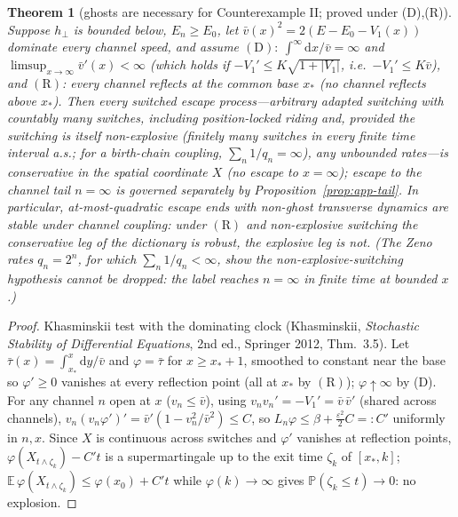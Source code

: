 \documentclass[11pt]{article}
\newtheorem{theorem}{Theorem}[section]
\theoremstyle{definition}
\theoremstyle{remark}
\newcommand{\dd}{\mathrm{d}}
\newcommand{\Prob}{\mathbb{P}}
\newcommand{\EE}{\mathbb{E}}
\begin{document}
\begin{theorem}[ghosts are necessary for Counterexample II; proved
under (D),(R)]\label{thm:app-ghost}
Suppose $h_{\perp}$ is bounded below, $E_{n}\ge E_{0}$, let
$\bar v(x)^{2}=2(E-E_{0}-V_{1}(x))$ dominate every channel speed, and
assume $(\mathrm D):\ \int^{\infty}\dd x/\bar v=\infty$ and
$\limsup_{x\to\infty}\bar v'(x)<\infty$ (which holds if
$-V_{1}'\le K\sqrt{1+|V_{1}|}$, i.e.\ $-V_{1}'\le K\bar v$),
and $(\mathrm R)$: every channel reflects at the common base $x_{*}$ (no
channel reflects above $x_{*}$). Then \emph{every} switched escape
process---arbitrary adapted switching with countably many switches,
including position-locked riding and, \emph{provided the switching is
itself non-explosive} (finitely many switches in every finite time interval
a.s.; for a birth-chain coupling, $\sum_{n}1/q_{n}=\infty$), any unbounded
rates---is conservative \emph{in the spatial coordinate} $X$ (no escape to
$x=\infty$); escape to the channel tail $n=\infty$ is governed separately by
Proposition~\ref{prop:app-tail}. In particular, at-most-quadratic escape ends with
non-ghost transverse dynamics are stable under
channel coupling: under $(\mathrm R)$ and non-explosive switching the
conservative leg of the dictionary
is robust, the explosive leg is not. (The Zeno rates $q_{n}=2^{n}$, for which
$\sum_{n}1/q_{n}<\infty$, show the non-explosive-switching hypothesis cannot be
dropped: the label reaches $n=\infty$ in finite time at bounded $x$.)
\end{theorem}

\begin{proof}
Khasminskii test with the dominating clock (Khasminskii,
\emph{Stochastic Stability of Differential Equations}, 2nd ed.,
Springer 2012, Thm.~3.5). Let $\bar\tau(x)=\int_{x_{*}}^{x}\dd y/\bar v$
and $\varphi=\bar\tau$ for $x\ge x_{*}+1$, smoothed to constant near the
base so $\varphi'\ge0$ vanishes at every reflection point (all at $x_{*}$ by
$(\mathrm R)$);
$\varphi\uparrow\infty$ by (D). For any channel $n$ open at $x$
($v_{n}\le\bar v$), using $v_{n}v_{n}'=-V_{1}'=\bar v\,\bar v'$ (shared
across channels),
$v_{n}(v_{n}\varphi')'=\bar v'(1-v_{n}^{2}/\bar v^{2})\le C$, so
$L_{n}\varphi\le\beta+\tfrac{\varepsilon^{2}}{2}C=:C'$ uniformly in
$n,x$. Since $X$ is continuous across switches and $\varphi'$ vanishes
at reflection points, $\varphi(X_{t\wedge\zeta_{k}})-C't$ is a
supermartingale up to the exit time $\zeta_{k}$ of $[x_{*},k]$;
$\EE\,\varphi(X_{t\wedge\zeta_{k}})\le\varphi(x_{0})+C't$ while
$\varphi(k)\to\infty$ gives $\Prob(\zeta_{k}\le t)\to0$: no explosion.
\end{proof}
\end{document}
